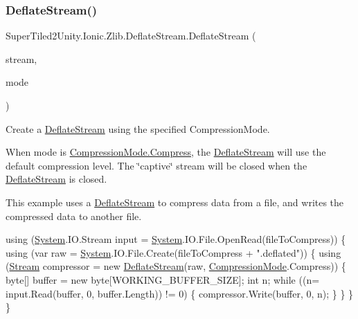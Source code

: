 \subsubsection{\texorpdfstring{Deflate\+Stream()}{DeflateStream()}\hspace{0.1cm}{\footnotesize\ttfamily [1/4]}}
{\footnotesize\ttfamily Super\+Tiled2\+Unity.\+Ionic.\+Zlib.\+Deflate\+Stream.\+Deflate\+Stream (\begin{DoxyParamCaption}\item[{System.\+I\+O.\+Stream}]{stream,  }\item[{\mbox{\hyperlink{namespace_super_tiled2_unity_1_1_ionic_1_1_zlib_ad5b7635d92497e1c905e5de82eb1c6b1}{Compression\+Mode}}}]{mode }\end{DoxyParamCaption})}



Create a \mbox{\hyperlink{class_super_tiled2_unity_1_1_ionic_1_1_zlib_1_1_deflate_stream}{Deflate\+Stream}} using the specified Compression\+Mode. 

When mode is {\ttfamily \mbox{\hyperlink{namespace_super_tiled2_unity_1_1_ionic_1_1_zlib_ad5b7635d92497e1c905e5de82eb1c6b1a8fa4fcfcda70410e089984d5f51ae97d}{Compression\+Mode.\+Compress}}}, the \mbox{\hyperlink{class_super_tiled2_unity_1_1_ionic_1_1_zlib_1_1_deflate_stream}{Deflate\+Stream}} will use the default compression level. The \char`\"{}captive\char`\"{} stream will be closed when the \mbox{\hyperlink{class_super_tiled2_unity_1_1_ionic_1_1_zlib_1_1_deflate_stream}{Deflate\+Stream}} is closed. 

This example uses a \mbox{\hyperlink{class_super_tiled2_unity_1_1_ionic_1_1_zlib_1_1_deflate_stream}{Deflate\+Stream}} to compress data from a file, and writes the compressed data to another file. 
\begin{DoxyCode}
\textcolor{keyword}{using} (\mbox{\hyperlink{namespace_system}{System}}.IO.Stream input = \mbox{\hyperlink{namespace_system}{System}}.IO.File.OpenRead(fileToCompress))
\{
    \textcolor{keyword}{using} (var raw = \mbox{\hyperlink{namespace_system}{System}}.IO.File.Create(fileToCompress + \textcolor{stringliteral}{".deflated"}))
    \{
        \textcolor{keyword}{using} (\mbox{\hyperlink{namespace_super_tiled2_unity_1_1_ionic_1_1_zip_a9ced5352c56e7e0fceff15b534073c83aeae835e83c0494a376229f254f7d3392}{Stream}} compressor = \textcolor{keyword}{new} \mbox{\hyperlink{class_super_tiled2_unity_1_1_ionic_1_1_zlib_1_1_deflate_stream_af95bf312acc17bc60b20767178959549}{DeflateStream}}(raw, 
      \mbox{\hyperlink{namespace_super_tiled2_unity_1_1_ionic_1_1_zlib_ad5b7635d92497e1c905e5de82eb1c6b1}{CompressionMode}}.Compress))
        \{
            byte[] buffer = \textcolor{keyword}{new} byte[WORKING\_BUFFER\_SIZE];
            \textcolor{keywordtype}{int} n;
            \textcolor{keywordflow}{while} ((n= input.Read(buffer, 0, buffer.Length)) != 0)
            \{
                compressor.Write(buffer, 0, n);
            \}
        \}
    \}
\}
\end{DoxyCode}



